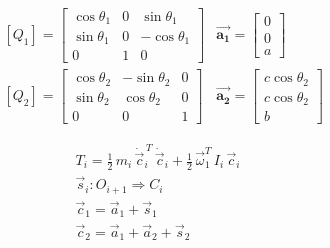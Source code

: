 \documentclass[conference]{IEEEtran}
\begin{document}
\begin{small}
    \begin{align*}
         & \left[Q_1\right] = \begin{bmatrix}
                                  \cos \theta_1 & 0 & \sin \theta_1   \\
                                  \sin \theta_1 & 0 & - \cos \theta_1 \\
                                  0             & 1 & 0
                              \end{bmatrix} & \vec{\mathbf{a_1}} =
        \begin{bmatrix}
            0 \\
            0 \\
            a
        \end{bmatrix}                                             \\
         & \left[Q_2\right] = \begin{bmatrix}
                                  \cos \theta_2 & - \sin \theta_2 & 0 \\
                                  \sin \theta_2 & \cos \theta_2   & 0 \\
                                  0             & 0               & 1
                              \end{bmatrix} & \vec{\mathbf{a_2}} =
        \begin{bmatrix}
            c \cos \theta_2 \\
            c \cos \theta_2 \\
            b
        \end{bmatrix}
    \end{align*}
\end{small}

\begin{gather}
    T_i = \frac{1}{2} \, m_i \, \dot{\vec{c}}_i^{\,T} \, \dot{\vec{c}}_i + \frac{1}{2} \, \vec{\omega}_1^T \, I_i \, \vec{c}_i \\
    \vec{s}_i : O_{i+1} \Longrightarrow C_i \\
    \vec{c}_1 = \vec{a}_1 + \vec{s}_1 \\
    \vec{c}_2 = \vec{a}_1 + \vec{a}_2 + \vec{s}_2
\end{gather}
\end{document}
